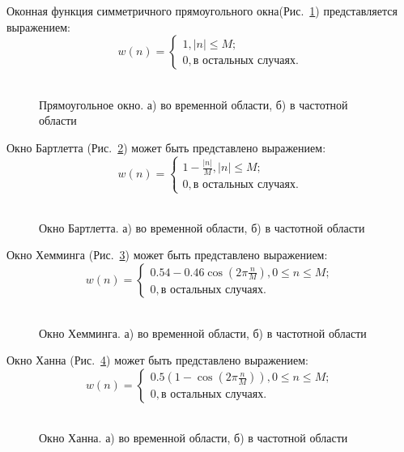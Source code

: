 Оконная функция симметричного прямоугольного окна(\mbox{Рис. \ref{pic:win_rect}}) представляется выражением:
\begin{equation}
	\label{eq:rect_window}
	 w(n) = \begin{cases}
		1, |n| \le M; \\
		0, \mbox{в остальных случаях}.
		\end{cases}
\end{equation}
\begin{figure}[h]
	\center{}
	\caption{\\Прямоугольное окно. а) во временной области, б) в частотной области}
	\label{pic:win_rect}
\end{figure}

Окно Бартлетта (\mbox{Рис. \ref{pic:win_bart}}) может быть представлено выражением:
\begin{equation}
	\label{eq:rect_bartlett}
	 w(n) = \begin{cases}
		1 - \frac{|n|}{M}, |n| \le M; \\
		0, \mbox{в остальных случаях}.
		\end{cases}
\end{equation}
\begin{figure}[h]
	\center{}
	\caption{\\Окно Бартлетта. а) во временной области, б) в частотной области}
	\label{pic:win_bart}
\end{figure}

Окно Хемминга (\mbox{Рис. \ref{pic:win_hamming}}) может быть представлено выражением:
\begin{equation}
	\label{eq:rect_hamming}
	 w(n) = \begin{cases}
		0.54 - 0.46\cos \left( 2 \pi \frac{n}{M} \right), 0 \le n \le M; \\
		0, \mbox{в остальных случаях}.
		\end{cases}
\end{equation}
\begin{figure}[h]
	\center{}
	\caption{\\Окно Хемминга. а) во временной области, б) в частотной области}
	\label{pic:win_hamming}
\end{figure}

Окно Ханна (\mbox{Рис. \ref{pic:win_hann}}) может быть представлено выражением:
\begin{equation}
	\label{eq:rect_hann}
	 w(n) = \begin{cases}
		0.5 \left( 1 - \cos\left( 2 \pi \frac{n}{M} \right) \right), 0 \le n \le M; \\
		0, \mbox{в остальных случаях}.
		\end{cases}
\end{equation}
\begin{figure}[h]
	\center{}
	\caption{\\Окно Ханна. а) во временной области, б) в частотной области}
	\label{pic:win_hann}
\end{figure}


